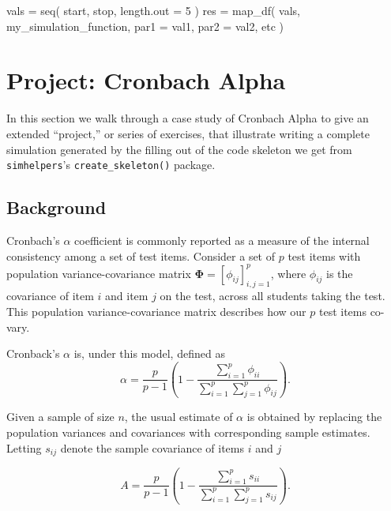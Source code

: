 \documentclass[
]{book}
\newenvironment{Shaded}{\begin{snugshade}}{\end{snugshade}}
\newcommand{\AttributeTok}[1]{\textcolor[rgb]{0.77,0.63,0.00}{#1}}
\newcommand{\DecValTok}[1]{\textcolor[rgb]{0.00,0.00,0.81}{#1}}
\newcommand{\FunctionTok}[1]{\textcolor[rgb]{0.00,0.00,0.00}{#1}}
\newcommand{\NormalTok}[1]{#1}
\newcommand{\OtherTok}[1]{\textcolor[rgb]{0.56,0.35,0.01}{#1}}
\begin{document}
\begin{Shaded}
\begin{Highlighting}[]
\NormalTok{vals }\OtherTok{=} \FunctionTok{seq}\NormalTok{( start, stop, }\AttributeTok{length.out =} \DecValTok{5}\NormalTok{ )}
\NormalTok{res }\OtherTok{=} \FunctionTok{map\_df}\NormalTok{( vals, my\_simulation\_function, }
              \AttributeTok{par1 =}\NormalTok{ val1, }\AttributeTok{par2 =}\NormalTok{ val2, etc )}
\end{Highlighting}
\end{Shaded}

\hypertarget{case_Cronbach}{%
\chapter{Project: Cronbach Alpha}\label{case_Cronbach}}

In this section we walk through a case study of Cronbach Alpha to give an extended ``project,'' or series of exercises, that illustrate writing a complete simulation generated by the filling out of the code skeleton we get from \texttt{simhelpers}'s \texttt{create\_skeleton()} package.

\hypertarget{background}{%
\section{Background}\label{background}}

Cronbach's \(\alpha\) coefficient is commonly reported as a measure of the internal consistency among a set of test items. Consider a set of \(p\) test items with population variance-covariance matrix \(\boldsymbol\Phi = \left[\phi_{ij}\right]_{i,j=1}^p\), where \(\phi_{ij}\) is the covariance of item \(i\) and item \(j\) on the test, across all students taking the test.
This population variance-covariance matrix describes how our \(p\) test items co-vary.

Cronback's \(\alpha\) is, under this model, defined as
\[
\alpha = \frac{p}{p - 1}\left(1 - \frac{\sum_{i=1}^p \phi_{ii}}{\sum_{i=1}^p \sum_{j=1}^p \phi_{ij}}\right).
\]

Given a sample of size \(n\), the usual estimate of \(\alpha\) is obtained by replacing the population variances and covariances with corresponding sample estimates. Letting \(s_{ij}\) denote the sample covariance of items \(i\) and \(j\)

\[
A = \frac{p}{p - 1}\left(1 - \frac{\sum_{i=1}^p s_{ii}}{\sum_{i=1}^p \sum_{j=1}^p s_{ij}}\right).
\]
\end{document}
